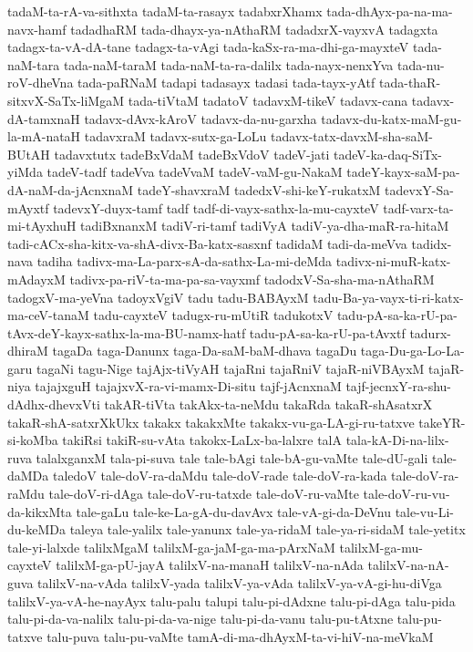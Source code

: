 {tadaM-ta-rA-va-sithxta
tadaM-ta-rasayx
tadabxrXhamx
tada-dhAyx-pa-na-ma-navx-hamf
tadadhaRM
tada-dhayx-ya-nAthaRM
tadadxrX-vayxvA
tadagxta
tadagx-ta-vA-dA-tane
tadagx-ta-vAgi
tada-kaSx-ra-ma-dhi-ga-mayxteV
tada-naM-tara
tada-naM-taraM
tada-naM-ta-ra-dalilx
tada-nayx-nenxYva
tada-nu-roV-dheVna
tada-paRNaM
tadapi
tadasayx
tadasi
tada-tayx-yAtf
tada-thaR-sitxvX-SaTx-liMgaM
tada-tiVtaM
tadatoV
tadavxM-tikeV
tadavx-cana
tadavx-dA-tamxnaH
tadavx-dAvx-kAroV
tadavx-da-nu-garxha
tadavx-du-katx-maM-gu-la-mA-nataH
tadavxraM
tadavx-sutx-ga-LoLu
tadavx-tatx-davxM-sha-saM-BUtAH
tadavxtutx
tadeBxVdaM
tadeBxVdoV
tadeV-jati
tadeV-ka-daq-SiTx-yiMda
tadeV-tadf
tadeVva
tadeVvaM
tadeV-vaM-gu-NakaM
tadeY-kayx-saM-pa-dA-naM-da-jAcnxnaM
tadeY-shavxraM
tadedxV-shi-keY-rukatxM
tadevxY-Sa-mAyxtf
tadevxY-duyx-tamf
tadf
tadf-di-vayx-sathx-la-mu-cayxteV
tadf-varx-ta-mi-tAyxhuH
tadiBxnanxM
tadiV-ri-tamf
tadiVyA
tadiV-ya-dha-maR-ra-hitaM
tadi-cACx-sha-kitx-va-shA-divx-Ba-katx-sasxnf
tadidaM
tadi-da-meVva
tadidx-nava
tadiha
tadivx-ma-La-parx-sA-da-sathx-La-mi-deMda
tadivx-ni-muR-katx-mAdayxM
tadivx-pa-riV-ta-ma-pa-sa-vayxmf
tadodxV-Sa-sha-ma-nAthaRM
tadogxV-ma-yeVna
tadoyxVgiV
tadu
tadu-BABAyxM
tadu-Ba-ya-vayx-ti-ri-katx-ma-ceV-tanaM
tadu-cayxteV
tadugx-ru-mUtiR
tadukotxV
tadu-pA-sa-ka-rU-pa-tAvx-deY-kayx-sathx-la-ma-BU-namx-hatf
tadu-pA-sa-ka-rU-pa-tAvxtf
tadurx-dhiraM
tagaDa
taga-Danunx
taga-Da-saM-baM-dhava
tagaDu
taga-Du-ga-Lo-La-garu
tagaNi
tagu-Nige
tajAjx-tiVyAH
tajaRni
tajaRniV
tajaR-niVBAyxM
tajaR-niya
tajajxguH
tajajxvX-ra-vi-mamx-Di-situ
tajf-jAcnxnaM
tajf-jecnxY-ra-shu-dAdhx-dhevxVti
takAR-tiVta
takAkx-ta-neMdu
takaRda
takaR-shAsatxrX
takaR-shA-satxrXkUkx
takakx
takakxMte
takakx-vu-ga-LA-gi-ru-tatxve
takeYR-si-koMba
takiRsi
takiR-su-vAta
takokx-LaLx-ba-lalxre
talA
tala-kA-Di-na-lilx-ruva
talalxganxM
tala-pi-suva
tale
tale-bAgi
tale-bA-gu-vaMte
tale-dU-gali
tale-daMDa
taledoV
tale-doV-ra-daMdu
tale-doV-rade
tale-doV-ra-kada
tale-doV-ra-raMdu
tale-doV-ri-dAga
tale-doV-ru-tatxde
tale-doV-ru-vaMte
tale-doV-ru-vu-da-kikxMta
tale-gaLu
tale-ke-La-gA-du-davAvx
tale-vA-gi-da-DeVnu
tale-vu-Li-du-keMDa
taleya
tale-yalilx
tale-yanunx
tale-ya-ridaM
tale-ya-ri-sidaM
tale-yetitx
tale-yi-lalxde
talilxMgaM
talilxM-ga-jaM-ga-ma-pArxNaM
talilxM-ga-mu-cayxteV
talilxM-ga-pU-jayA
talilxV-na-manaH
talilxV-na-nAda
talilxV-na-nA-guva
talilxV-na-vAda
talilxV-yada
talilxV-ya-vAda
talilxV-ya-vA-gi-hu-diVga
talilxV-ya-vA-he-nayAyx
talu-palu
talupi
talu-pi-dAdxne
talu-pi-dAga
talu-pida
talu-pi-da-va-nalilx
talu-pi-da-va-nige
talu-pi-da-vanu
talu-pu-tAtxne
talu-pu-tatxve
talu-puva
talu-pu-vaMte
tamA-di-ma-dhAyxM-ta-vi-hiV-na-meVkaM
}
